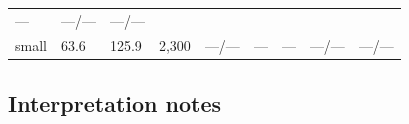 \documentclass[
  9pt, a4paper, landscape]{article}
\begin{document}
\begin{longtable}[]{@{}lllllllll@{}}
\begin{minipage}[t]{0.08\columnwidth}
---\strut
\end{minipage} & \begin{minipage}[t]{0.08\columnwidth}\raggedright
---/---\strut
\end{minipage} & \begin{minipage}[t]{0.08\columnwidth}\raggedright
---/---\strut
\end{minipage}\tabularnewline
\begin{minipage}[t]{0.08\columnwidth}\raggedright
small\strut
\end{minipage} & \begin{minipage}[t]{0.08\columnwidth}\raggedright
63.6\strut
\end{minipage} & \begin{minipage}[t]{0.08\columnwidth}\raggedright
125.9\strut
\end{minipage} & \begin{minipage}[t]{0.08\columnwidth}\raggedright
2,300\strut
\end{minipage} & \begin{minipage}[t]{0.08\columnwidth}\raggedright
---/---\strut
\end{minipage} & \begin{minipage}[t]{0.08\columnwidth}\raggedright
---\strut
\end{minipage} & \begin{minipage}[t]{0.08\columnwidth}\raggedright
---\strut
\end{minipage} & \begin{minipage}[t]{0.08\columnwidth}\raggedright
---/---\strut
\end{minipage} & \begin{minipage}[t]{0.08\columnwidth}\raggedright
---/---\strut
\end{minipage}\tabularnewline
\bottomrule
\end{longtable}

\hypertarget{interpretation-notes}{%
\subsection{Interpretation notes}\label{interpretation-notes}}
\end{document}
